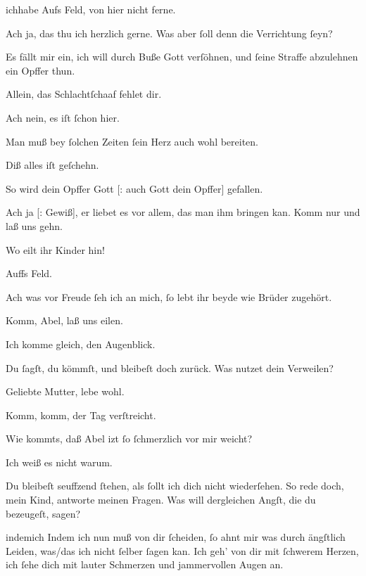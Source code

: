 \documentclass[tocstyle=ref-genre]{ees}
\begin{document}
{\begin{movement}{ichhabe}
  \voice[Cain]
  Aufs Feld, von hier nicht ferne.

  \voice[Abel]
  Ach ja, das thu ich herzlich gerne.
  Was aber ſoll denn die Verrichtung ſeyn?

  \voice[Cain]
  Es fällt mir ein,
  ich will durch Buße Gott verſöhnen,
  und ſeine Straffe abzulehnen
  ein Opffer thun.

  \voice[Abel]
  Allein, das Schlachtſchaaf fehlet dir.

  \voice[Cain]
  Ach nein, es iſt ſchon hier.

  \voice[Abel]
  Man muß bey ſolchen Zeiten
  ſein Herz auch wohl bereiten.

  \voice[Cain]
  Diß alles iſt geſchehn.

  \voice[Abel]
  So wird dein Opffer Gott [: auch Gott dein Opffer] gefallen.

  \voice[Cain]
  Ach ja [: Gewiß], er liebet es vor allem,
  das man ihm bringen kan. Komm nur und laß uns gehn.

  \voice[Eva]
  Wo eilt ihr Kinder hin!

  Auffs Feld.

  \voice[Eva]
  Ach was vor Freude
  ſeh ich an mich, ſo lebt ihr beyde
  wie Brüder zugehört.

  \voice[Cain]
  Komm, Abel, laß uns eilen.

  \voice[Abel]
  Ich komme gleich, den Augenblick.

  \voice[Cain]
  Du ſagſt, du kömmſt, und bleibeſt doch zurück.
  Was nutzet dein Verweilen?

  \voice[Abel]
  Geliebte Mutter, lebe wohl.

  \voice[Cain]
  Komm, komm, der Tag verſtreicht.

  \voice[Eva]
  Wie kommts, daß Abel izt ſo ſchmerzlich vor mir weicht?

  \voice[Abel]
  Ich weiß es nicht warum.

  \voice[Eva]
  Du bleibeſt seuffzend ſtehen,
  als ſollt ich dich nicht wiederſehen.
  So rede doch, mein Kind, antworte meinen Fragen.
  Was will dergleichen Angſt, die du bezeugeſt, sagen?
\end{movement}

\begin{movement}{indemich}
  \voice[Abel]
  Indem ich nun muß von dir ſcheiden,
  ſo ahnt mir was durch ängſtlich Leiden,
  was/das ich nicht ſelber ſagen kan.
  Ich geh’ von dir mit ſchwerem Herzen,
  ich ſehe dich mit lauter Schmerzen
  und jammervollen Augen an.
\end{movement}

}
\end{document}
